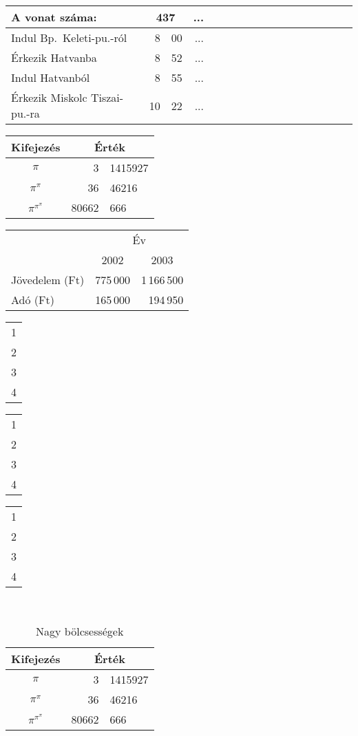\documentclass[a4paper]{article}
\begin{document}
\begin{tabular}{l||*8{r@{:}l|}}
A vonat száma: & \multicolumn{2}{c|}{437} & ...
\\
\hline\hline
Indul Bp.\ Keleti-pu.-ról & 8&00 & ... \\
Érkezik Hatvanba & 8&52 & ... \\
Indul Hatvanból & 8&55 & ... \\
Érkezik Miskolc Tiszai-pu.-ra & 10&22 & ... \\
\hline
\end{tabular}

\begin{tabular}{c|r@{,}l}
Kifejezés & \multicolumn{2}{c}{Érték} \\
\hline
$\pi$ & 3&1415927 \\
$\pi^\pi$ & 36&46216 \\
$\pi^{\pi^\pi}$ & 80662&666
\end{tabular}

\begin{tabular}{@{}lrr@{}}
\toprule
&\multicolumn{2}{c}{Év}\\
\cmidrule{2-3}
& \multicolumn{1}{c}{2002} &
\multicolumn{1}{c}{2003}\\
\midrule
Jövedelem (Ft)& 775\,000 & 1\,166\,500\\
Adó (Ft) & 165\,000 & 194\,950\\
\bottomrule
\end{tabular}

\hrulefill \begin{tabular}[t]{c} 1 \\ 2 \\ 3 \\ 4\end{tabular}%
\hrulefill \begin{tabular}{c} 1 \\ 2 \\ 3 \\ 4 \end{tabular}%
\hrulefill \begin{tabular}[b]{c} 1 \\ 2 \\ 3 \\ 4 \end{tabular}%
\hrulefill \\

\begin{table}[htb]
\caption{Nagy bölcsességek} %
\label{tab:fontos}
\center
\begin{tabular}{c|r@{,}l}
Kifejezés & \multicolumn{2}{c}{Érték} \\
\hline
$\pi$ & 3&1415927 \\
$\pi^\pi$ & 36&46216 \\
$\pi^{\pi^\pi}$ & 80662&666
\end{tabular}
\end{table}
\end{document}
